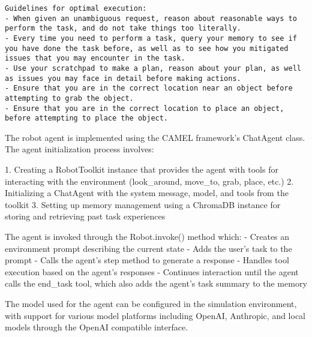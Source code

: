 \documentclass[../report.tex]{subfiles}
\begin{document}
{\begin{lstlisting}[basicstyle=\ttfamily, breaklines=true, breakatwhitespace=true]
Guidelines for optimal execution:
- When given an unambiguous request, reason about reasonable ways to perform the task, and do not take things too literally.
- Every time you need to perform a task, query your memory to see if you have done the task before, as well as to see how you mitigated issues that you may encounter in the task.
- Use your scratchpad to make a plan, reason about your plan, as well as issues you may face in detail before making actions.
- Ensure that you are in the correct location near an object before attempting to grab the object.
- Ensure that you are in the correct location to place an object, before attempting to place the object.
\end{lstlisting}
}
The robot agent is implemented using the CAMEL framework's ChatAgent class. The agent initialization process involves:

1. Creating a RobotToolkit instance that provides the agent with tools for interacting with the environment (look\_around, move\_to, grab, place, etc.)
2. Initializing a ChatAgent with the system message, model, and tools from the toolkit
3. Setting up memory management using a ChromaDB instance for storing and retrieving past task experiences

The agent is invoked through the Robot.invoke() method which:
- Creates an environment prompt describing the current state
- Adds the user's task to the prompt
- Calls the agent's step method to generate a response
- Handles tool execution based on the agent's responses
- Continues interaction until the agent calls the end\_task tool, which also adds the agent's task summary to the memory

The model used for the agent can be configured in the simulation environment, with support for various model platforms including OpenAI, Anthropic, and local models through the OpenAI compatible interface.
\end{document}
